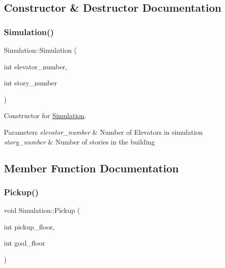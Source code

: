 \subsection{Constructor \& Destructor Documentation}
\mbox{\label{class_simulation_aa4160c22753211031194702166b1a516}} 
\subsubsection{\texorpdfstring{Simulation()}{Simulation()}}
{\footnotesize\ttfamily Simulation\+::\+Simulation (\begin{DoxyParamCaption}\item[{int}]{elevator\+\_\+number,  }\item[{int}]{story\+\_\+number }\end{DoxyParamCaption})}



Constructor for \mbox{\hyperlink{class_simulation}{Simulation}}. 


\begin{DoxyParams}{Parameters}
{\em elevator\+\_\+number} & Number of Elevators in simulation \\
\hline
{\em story\+\_\+number} & Number of stories in the building \\
\hline
\end{DoxyParams}


\subsection{Member Function Documentation}
\mbox{\label{class_simulation_a2b5b39a02fcde98b0e7b3f10c3f2703a}} 
\subsubsection{\texorpdfstring{Pickup()}{Pickup()}}
{\footnotesize\ttfamily void Simulation\+::\+Pickup (\begin{DoxyParamCaption}\item[{int}]{pickup\+\_\+floor,  }\item[{int}]{goal\+\_\+floor }\end{DoxyParamCaption})}



